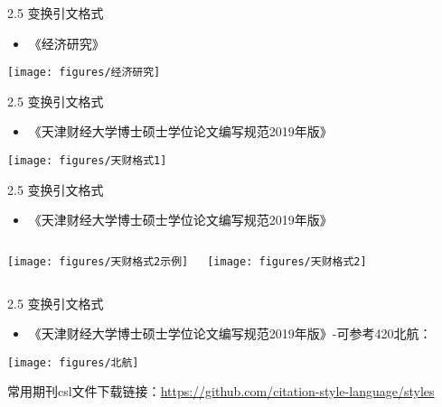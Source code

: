 \documentclass{beamer}%
\begin{document}
\begin{frame}[t]{2.5 变换引文格式}
\begin{itemize}
  \item 《经济研究》
\end{itemize}
\vspace{-0.25cm} %
\begin{center}
	\texttt{[image: figures/经济研究]}
\end{center}
\end{frame}

\begin{frame}[t]{2.5 变换引文格式}
\begin{itemize}
  \item 《天津财经大学博士硕士学位论文编写规范2019年版》
\end{itemize}
\vspace{-0.3cm} %
\begin{center}
	\texttt{[image: figures/天财格式1]}
\end{center}
\end{frame}


\begin{frame}[t]{2.5 变换引文格式}
\begin{itemize}
  \item 《天津财经大学博士硕士学位论文编写规范2019年版》
\end{itemize}
\begin{columns}[onlytextwidth]
\vspace{-0.3cm} %
\begin{center}
	\texttt{[image: figures/天财格式2示例]}
\end{center}
\begin{center}
	\texttt{[image: figures/天财格式2]}
\end{center}
\end{columns}
\end{frame}




\begin{frame}[t]{2.5 变换引文格式}
\begin{itemize}
  \item 《天津财经大学博士硕士学位论文编写规范2019年版》-可参考420北航：
\end{itemize}
\begin{center}
	\texttt{[image: figures/北航]}
\end{center}
\small 常用期刊csl文件下载链接：\href{https://github.com/citation-style-language/styles}{https://github.com/citation-style-language/styles}
\end{frame}
\end{document}
